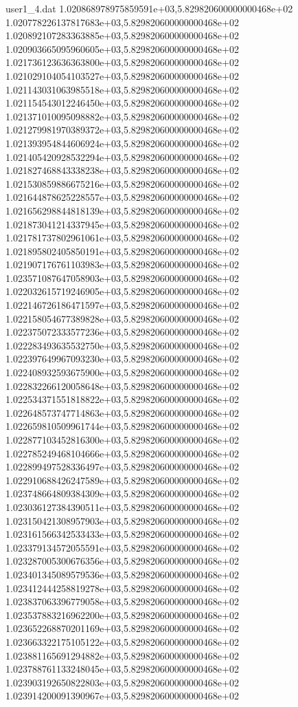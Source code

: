 \begin{filecontents}{user1_4.dat}
1.020868978975859591e+03,5.829820600000000468e+02
1.020778226137817683e+03,5.829820600000000468e+02
1.020892107283363885e+03,5.829820600000000468e+02
1.020903665095960605e+03,5.829820600000000468e+02
1.021736123636363800e+03,5.829820600000000468e+02
1.021029104054103527e+03,5.829820600000000468e+02
1.021143031063985518e+03,5.829820600000000468e+02
1.021154543012246450e+03,5.829820600000000468e+02
1.021371010095098882e+03,5.829820600000000468e+02
1.021279981970389372e+03,5.829820600000000468e+02
1.021393954844606924e+03,5.829820600000000468e+02
1.021405420928532294e+03,5.829820600000000468e+02
1.021827468843338238e+03,5.829820600000000468e+02
1.021530859886675216e+03,5.829820600000000468e+02
1.021644878625228557e+03,5.829820600000000468e+02
1.021656298844818139e+03,5.829820600000000468e+02
1.021873041214337945e+03,5.829820600000000468e+02
1.021781737802961061e+03,5.829820600000000468e+02
1.021895802405850191e+03,5.829820600000000468e+02
1.021907176761103983e+03,5.829820600000000468e+02
1.023571087647058903e+03,5.829820600000000468e+02
1.022032615719246905e+03,5.829820600000000468e+02
1.022146726186471597e+03,5.829820600000000468e+02
1.022158054677389828e+03,5.829820600000000468e+02
1.022375072333577236e+03,5.829820600000000468e+02
1.022283493635532750e+03,5.829820600000000468e+02
1.022397649967093230e+03,5.829820600000000468e+02
1.022408932593675900e+03,5.829820600000000468e+02
1.022832266120058648e+03,5.829820600000000468e+02
1.022534371551818822e+03,5.829820600000000468e+02
1.022648573747714863e+03,5.829820600000000468e+02
1.022659810509961744e+03,5.829820600000000468e+02
1.022877103452816300e+03,5.829820600000000468e+02
1.022785249468104666e+03,5.829820600000000468e+02
1.022899497528336497e+03,5.829820600000000468e+02
1.022910688426247589e+03,5.829820600000000468e+02
1.023748664809384309e+03,5.829820600000000468e+02
1.023036127384390511e+03,5.829820600000000468e+02
1.023150421308957903e+03,5.829820600000000468e+02
1.023161566342533433e+03,5.829820600000000468e+02
1.023379134572055591e+03,5.829820600000000468e+02
1.023287005300676356e+03,5.829820600000000468e+02
1.023401345089579536e+03,5.829820600000000468e+02
1.023412444258819278e+03,5.829820600000000468e+02
1.023837063396779058e+03,5.829820600000000468e+02
1.023537883216962200e+03,5.829820600000000468e+02
1.023652268870201169e+03,5.829820600000000468e+02
1.023663322175105122e+03,5.829820600000000468e+02
1.023881165691294882e+03,5.829820600000000468e+02
1.023788761133248045e+03,5.829820600000000468e+02
1.023903192650822803e+03,5.829820600000000468e+02
1.023914200091390967e+03,5.829820600000000468e+02

\end{filecontents}
